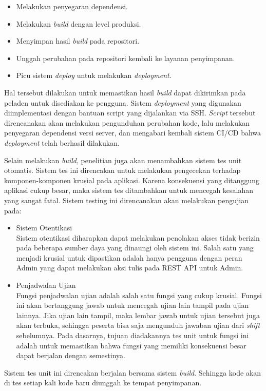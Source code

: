     \begin{itemize}
        \item Melakukan penyegaran dependensi.
        \item Melakukan \textit{build} dengan level produksi.
        \item Menyimpan hasil \textit{build} pada repositori.
        \item Unggah perubahan pada repositori kembali ke layanan penyimpanan.
        \item Picu sistem \textit{deploy} untuk melakukan \textit{deployment}.
    \end{itemize}
    
    Hal tersebut dilakukan untuk memastikan hasil \textit{build} dapat dikirimkan pada peladen untuk disediakan
    ke pengguna. Sistem \textit{deployment} yang digunakan diimplementasi dengan bantuan script yang dijalankan
    via SSH. \textit{Script} tersebut direncanakan akan melakukan pengunduhan perubahan kode, lalu melakukan
    penyegaran dependensi versi server, dan mengabari kembali sistem CI/CD bahwa \textit{deployment} telah
    berhasil dilakukan.
    
    Selain melakukan \textit{build}, penelitian juga akan menambahkan sistem tes unit otomatis. Sistem tes ini
    direncakan untuk melakukan pengecekan terhadap komponen-komponen krusial pada aplikasi. Karena konsekuensi
    yang ditanggung aplikasi cukup besar, maka sistem tes ditambahkan untuk mencegah kesalahan yang sangat
    fatal. Sistem testing ini direncanakan akan melakukan pengujian pada:
    
    \begin{itemize}
        \item Sistem Otentikasi \\
            Sistem otentikasi diharapkan dapat melakukan penolakan akses tidak berizin pada beberapa sumber daya
            yang dinaungi oleh sistem ini. Salah satu yang menjadi krusial untuk dipastikan adalah
            hanya pengguna dengan peran Admin yang dapat melakukan aksi tulis pada REST API untuk
            Admin.
        \item Penjadwalan Ujian \\
            Fungsi penjadwalan ujian adalah salah satu fungsi yang cukup krusial. Fungsi ini akan bertanggung
            jawab untuk mencegah ujian lain tampil pada ujian lainnya. Jika ujian lain tampil, maka lembar jawab
            untuk ujian tersebut juga akan terbuka, sehingga peserta bisa saja mengunduh jawaban ujian
            dari \textit{shift} sebelumnya. Pada dasarnya, tujuan diadakannya tes unit untuk fungsi ini
            adalah untuk memastikan bahwa fungsi yang memiliki konsekuensi besar dapat berjalan dengan
            semestinya.
    \end{itemize}
    
    Sistem tes unit ini direncakan berjalan bersama sistem \textit{build}. Sehingga kode akan di tes setiap kali
    kode baru diunggah ke tempat penyimpanan.
